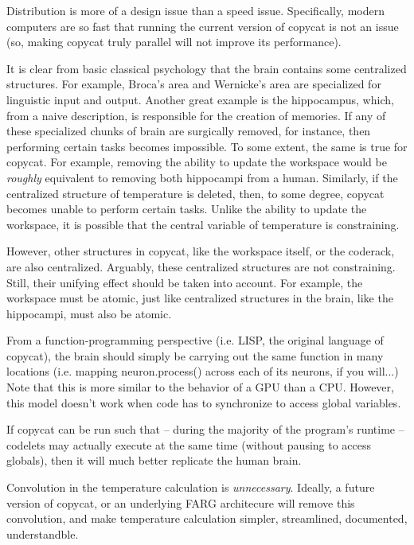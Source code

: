\documentclass[a4paper]{article}
\begin{document}
    Distribution is more of a design issue than a speed issue.
    Specifically, modern computers are so fast that running the current version of copycat is not an issue (so, making copycat truly parallel will not improve its performance).

    It is clear from basic classical psychology that the brain contains some centralized structures.
    For example, Broca's area and Wernicke's area are specialized for linguistic input and output.
    Another great example is the hippocampus, which, from a naive description, is responsible for the creation of memories.
    If any of these specialized chunks of brain are surgically removed, for instance, then performing certain tasks becomes impossible.
    To some extent, the same is true for copycat.
    For example, removing the ability to update the workspace would be \emph{roughly} equivalent to removing both hippocampi from a human.
    Similarly, if the centralized structure of temperature is deleted, then, to some degree, copycat becomes unable to perform certain tasks.
    Unlike the ability to update the workspace, it is possible that the central variable of temperature is constraining.

    However, other structures in copycat, like the workspace itself, or the coderack, are also centralized.
    Arguably, these centralized structures are not constraining.
    Still, their unifying effect should be taken into account.
    For example, the workspace must be atomic, just like centralized structures in the brain, like the hippocampi, must also be atomic.

    From a function-programming perspective (i.e. LISP, the original language of copycat), the brain should simply be carrying out the same function in many locations (i.e. mapping neuron.process() across each of its neurons, if you will...)
    Note that this is more similar to the behavior of a GPU than a CPU.
    However, this model doesn't work when code has to synchronize to access global variables.

    If copycat can be run such that -- during the majority of the program's runtime -- codelets may actually execute at the same time (without pausing to access globals), then it will much better replicate the human brain.

    Convolution in the temperature calculation is \emph{unnecessary}.
    Ideally, a future version of copycat, or an underlying FARG architecure will remove this convolution, and make temperature calculation simpler, streamlined, documented, understandble.
\end{document}
